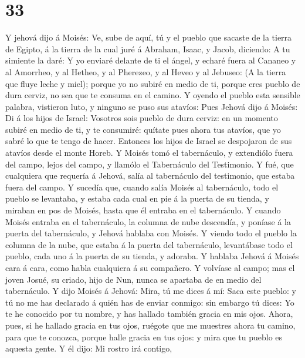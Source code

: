 \hypertarget{section-32}{%
\section{33}\label{section-32}}

 Y jehová dijo á Moisés: Ve, sube de aquí, tú y el pueblo
que sacaste de la tierra de Egipto, á la tierra de la cual juré á
Abraham, Isaac, y Jacob, diciendo: A tu simiente la daré:  Y
yo enviaré delante de ti el ángel, y echaré fuera al Cananeo y al
Amorrheo, y al Hetheo, y al Pherezeo, y al Heveo y al Jebuseo:
 (A la tierra que fluye leche y miel); porque yo no subiré
en medio de ti, porque eres pueblo de dura cerviz, no sea que te consuma
en el camino.  Y oyendo el pueblo esta sensible palabra,
vistieron luto, y ninguno se puso sus atavíos:  Pues Jehová
dijo á Moisés: Di á los hijos de Israel: Vosotros sois pueblo de dura
cerviz: en un momento subiré en medio de ti, y te consumiré: quítate
pues ahora tus atavíos, que yo sabré lo que te tengo de hacer.
 Entonces los hijos de Israel se despojaron de sus atavíos
desde el monte Horeb.  Y Moisés tomó el tabernáculo, y
extendiólo fuera del campo, lejos del campo, y llamólo el Tabernáculo
del Testimonio. Y fué, que cualquiera que requería á Jehová, salía al
tabernáculo del testimonio, que estaba fuera del campo.  Y
sucedía que, cuando salía Moisés al tabernáculo, todo el pueblo se
levantaba, y estaba cada cual en pie á la puerta de su tienda, y miraban
en pos de Moisés, hasta que él entraba en el tabernáculo.  Y
cuando Moisés entraba en el tabernáculo, la columna de nube descendía, y
poníase á la puerta del tabernáculo, y Jehová hablaba con Moisés.
 Y viendo todo el pueblo la columna de la nube, que estaba
á la puerta del tabernáculo, levantábase todo el pueblo, cada uno á la
puerta de su tienda, y adoraba.  Y hablaba Jehová á Moisés
cara á cara, como habla cualquiera á su compañero. Y volvíase al campo;
mas el joven Josué, su criado, hijo de Nun, nunca se apartaba de en
medio del tabernáculo.  Y dijo Moisés á Jehová: Mira, tú me
dices á mí: Saca este pueblo: y tú no me has declarado á quién has de
enviar conmigo: sin embargo tú dices: Yo te he conocido por tu nombre, y
has hallado también gracia en mis ojos.  Ahora, pues, si he
hallado gracia en tus ojos, ruégote que me muestres ahora tu camino,
para que te conozca, porque halle gracia en tus ojos: y mira que tu
pueblo es aquesta gente.  Y él dijo: Mi rostro irá contigo,
